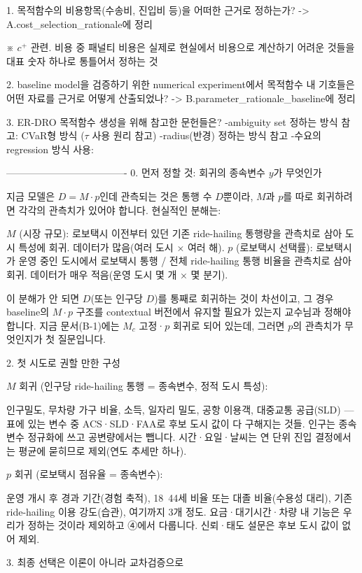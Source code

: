1. 목적함수의 비용항목(수송비, 진입비 등)을 어떠한 근거로 정하는가?
-> A.cost_selection_rationale에 정리

※ $c^+$ 관련. 비용 중 패널티 비용은 실제로 현실에서 비용으로 계산하기 어려운 것들을 대표 숫자 하나로 통틀어서 정하는 것

2. baseline model을 검증하기 위한 numerical experiment에서 목적함수 내 기호들은 어떤 자료를 근거로 어떻게 산출되었나?
-> B.parameter_rationale_baseline에 정리

3. ER-DRO 목적함수 생성을 위해 참고한 문헌들은?
-ambiguity set 정하는 방식 참고: CVaR형 방식
($\tau$ 사용 원리 참고)
-radius(반경) 정하는 방식 참고
-수요의 regression 방식 사용:

-------------------------------------
0. 먼저 정할 것: 회귀의 종속변수 $y$가 무엇인가

지금 모델은 $D=M\cdot p$인데 관측되는 것은 통행 수 $D$뿐이라, $M$과 $p$를 따로 회귀하려면 각각의 관측치가 있어야 합니다. 현실적인 분해는:

$M$ (시장 규모): 로보택시 이전부터 있던 기존 ride-hailing 통행량을 관측치로 삼아 도시 특성에 회귀. 데이터가 많음(여러 도시 × 여러 해).
$p$ (로보택시 선택률): 로보택시가 운영 중인 도시에서 로보택시 통행 / 전체 ride-hailing 통행 비율을 관측치로 삼아 회귀. 데이터가 매우 적음(운영 도시 몇 개 × 몇 분기).

이 분해가 안 되면 $D$(또는 인구당 $D$)를 통째로 회귀하는 것이 차선이고, 그 경우 baseline의 $M\cdot p$ 구조를 contextual 버전에서 유지할 필요가 있는지 교수님과 정해야 합니다. 지금 문서(B-1)에는 $M_c$ 고정·$p$ 회귀로 되어 있는데, 그러면 $p$의 관측치가 무엇인지가 첫 질문입니다.

2. 첫 시도로 권할 만한 구성

$M$ 회귀 (인구당 ride-hailing 통행 = 종속변수, 정적 도시 특성):

인구밀도, 무차량 가구 비율, 소득, 일자리 밀도, 공항 이용객, 대중교통 공급(SLD) — 표에 있는 변수 중 ACS·SLD·FAA로 후보 도시 값이 다 구해지는 것들. 인구는 종속변수 정규화에 쓰고 공변량에서는 뺍니다.
시간·요일·날씨는 연 단위 진입 결정에서는 평균에 묻히므로 제외(연도 추세만 하나).

$p$ 회귀 (로보택시 점유율 = 종속변수):

운영 개시 후 경과 기간(경험 축적), 18~44세 비율 또는 대졸 비율(수용성 대리), 기존 ride-hailing 이용 강도(습관), 여기까지 3개 정도.
요금·대기시간·차량 내 기능은 우리가 정하는 것이라 제외하고 ④에서 다룹니다. 신뢰·태도 설문은 후보 도시 값이 없어 제외.

3. 최종 선택은 이론이 아니라 교차검증으로

